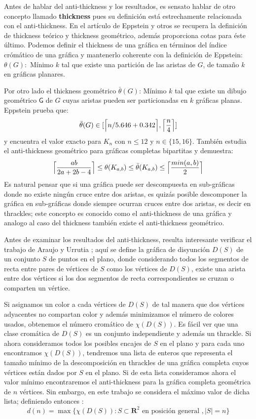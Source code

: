 Antes de hablar del anti-thickness y los resultados, es sensato hablar de otro
concepto llamado \textbf{thickness} pues su definición está estrechamente
relacionada con el anti-thickness. En el artículo de Eppstein y otros
\cite{Dillencourt2004} se recupera la definición de thickness teórico y thickness
geométrico, además proporciona cotas para éste último. Podemos definir el
thickness de una gráfica en términos del índice crómático de una gráfica y
mantenerlo coherente con la definición de Eppstein: $\theta(G):$ Mínimo $k$
tal que existe una partición de las aristas de $G$, de tamaño $k$ en gráficas planares.

Por otro lado el thickness geométrico $\bar{\theta}(G)$: Mínimo $k$ tal que
existe un dibujo geométrico $\mathsf{G}$ de $G$ cuyas aristas pueden ser
particionadas en $k$ gráficas planas. Eppstein prueba que:
\[ \bar{\theta}(G) \in [\Bigl\lceil n/5.646 + 0.342 \Bigr\rceil, \Bigl\lceil\frac{n}{4}\Bigr\rceil] \]
y encuentra el valor exacto para $K_n$ con $n\leq 12$ y $n\in\{15,16\}$. También
estudia el anti-thickness geométrico para gráficas completas bipartitas y demuestra:
\[
  \Bigl\lceil \frac{ab}{2a+2b-4} \Bigr\rceil \leq \theta(K_{a,b}) \leq \bar{\theta}(K_{a,b})
  \leq \Bigl\lceil \frac{min(a,b)}{2} \Bigr\rceil
\]
Es natural pensar que si una gráfica puede ser descompuesta en sub-gráficas donde
no existe ningún cruce entre dos aristas, es quizás posible descomponer la
gráfica en sub-gráficas donde siempre ocurran cruces entre dos aristas, es decir
en thrackles; este concepto es conocido como el anti-thickness de una gráfica y
analogo al caso del thickness también existe el anti-thickness geométrico.

Antes de examinar los resultados del anti-thickness, resulta interesante verificar
el trabajo de Araujo y Urrutia \cite{Araujo2005}; aquí se define la gráfica de
disyunción $D(S)$ de un conjunto $S$ de puntos en el plano, donde considerando
todos los segmentos de recta entre pares de vértices de $S$ como los vértices
de $D(S)$, existe una arista entre dos vértices si los dos segmentos
de recta correspondientes se cruzan o comparten un vértice.

Si asignamos un color a cada vértices de $D(S)$ de tal manera que dos
vértices adyacentes no compartan color y además minimizamos el número de colores
usados, obtenemos el número cromático de $\chi(D(S))$. Es fácil ver que una
clase cromática de $D(S)$ es un conjunto independiente y además un thrackle. Si
ahora consideramos todos los posibles encajes de $S$ en el plano y para cada uno
encontramos $\chi(D(S))$, tendremos una lista de enteros que representa el tamaño
mínimo de la descomposición en thrackles de una gráfica completa cuyos
vértices están dados por $S$ en el plano. Si de esta lista consideramos ahora
el valor mínimo encontraremos el anti-thickness para la gráfica completa geométrica de
$n$ vértices. Sin embargo, en este trabajo se considera el máximo valor de dicha lista;
definiendo entonces :
\[ d(n) = \max\{\chi(D(S)): S \subset \mathbf{R}^2 \text{ en posición general }, |S|=n\}\]

